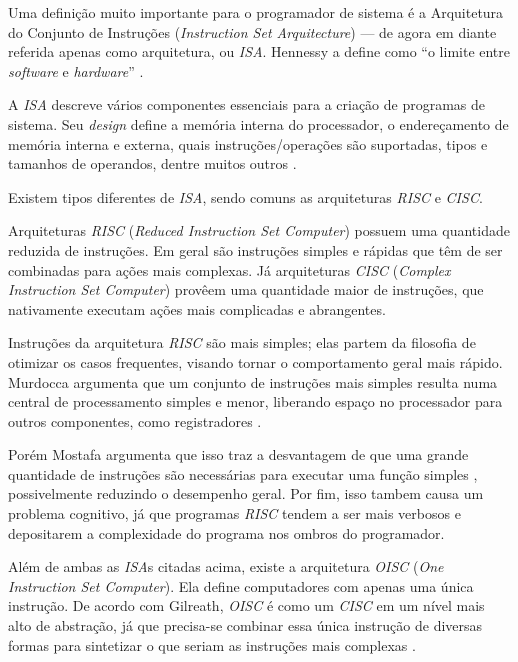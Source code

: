 
Uma definição muito importante para o programador de sistema é a Arquitetura do
Conjunto de Instruções (\textit{Instruction Set Arquitecture}) --- de agora em
diante referida apenas como arquitetura, ou \textit{ISA}. Hennessy a define como
``o limite entre \textit{software} e \textit{hardware}'' \cite{hennessy}.

A \textit{ISA} descreve vários componentes essenciais para a criação de
programas de sistema. Seu \textit{design} define a memória interna do
processador, o endereçamento de memória interna e externa, quais
instruções/operações são suportadas, tipos e tamanhos de operandos, dentre
muitos outros  \cite{patterson}.

Existem tipos diferentes de \textit{ISA}, sendo comuns as arquiteturas
\textit{RISC} e \textit{CISC}.

Arquiteturas \textit{RISC} (\textit{Reduced Instruction Set Computer}) possuem
uma quantidade reduzida de instruções. Em geral são instruções simples e rápidas
que têm de ser combinadas para ações mais complexas. Já arquiteturas
\textit{CISC} (\textit{Complex Instruction Set Computer}) provêem uma quantidade
maior de instruções, que nativamente executam ações mais complicadas e
abrangentes.

Instruções da arquitetura \textit{RISC} são mais simples; elas partem da
filosofia de otimizar os casos frequentes, visando tornar o comportamento geral
mais rápido. Murdocca argumenta que um conjunto de instruções mais simples
resulta numa central de processamento simples e menor, liberando espaço no
processador para outros componentes, como registradores \cite{principles}.

Porém Mostafa argumenta que isso traz a desvantagem de que uma grande quantidade
de instruções são necessárias para executar uma função simples \cite{mostafa},
possivelmente reduzindo o desempenho geral. Por fim, isso tambem causa um
problema cognitivo, já que programas \textit{RISC} tendem a ser mais verbosos e
depositarem a complexidade do programa nos ombros do programador.

Além de ambas as \textit{ISA}s citadas acima, existe a arquitetura \textit{OISC}
(\textit{One Instruction Set Computer}). Ela define computadores com apenas uma
única instrução. De acordo com Gilreath, \textit{OISC} é como um \textit{CISC}
em um nível mais alto de abstração, já que precisa-se combinar essa única
instrução de diversas formas para sintetizar o que seriam as instruções mais
complexas \cite{minimalist}.

